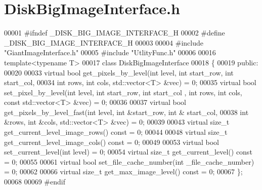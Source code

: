 \section{Disk\-Big\-Image\-Interface.\-h}
\label{_disk_big_image_interface_8h}

\begin{DoxyCode}
00001 \textcolor{preprocessor}{#ifndef \_DISK\_BIG\_IMAGE\_INTERFACE\_H}
00002 \textcolor{preprocessor}{}\textcolor{preprocessor}{#define \_DISK\_BIG\_IMAGE\_INTERFACE\_H}
00003 \textcolor{preprocessor}{}
00004 \textcolor{preprocessor}{#include "GiantImageInterface.h"}
00005 \textcolor{preprocessor}{#include "UtlityFunc.h"}
00006 
00016 \textcolor{keyword}{template}<\textcolor{keyword}{typename} T>
00017 \textcolor{keyword}{class }DiskBigImageInterface
00018 \{
00019 \textcolor{keyword}{public}:
00020 
00033         \textcolor{keyword}{virtual} \textcolor{keywordtype}{bool} get_pixels_by_level(\textcolor{keywordtype}{int} level, \textcolor{keywordtype}{int} start\_row, \textcolor{keywordtype}{int} 
      start\_col,
00034                 \textcolor{keywordtype}{int} rows, \textcolor{keywordtype}{int} cols, std::vector<T> &vec) = 0;
00035         \textcolor{keyword}{virtual} \textcolor{keywordtype}{bool} set\_pixel\_by\_level(\textcolor{keywordtype}{int} level, \textcolor{keywordtype}{int} start\_row, \textcolor{keywordtype}{int} start\_col
      , \textcolor{keywordtype}{int} rows, \textcolor{keywordtype}{int} cols, \textcolor{keyword}{const} std::vector<T> &vec) = 0;
00036 
00037         \textcolor{keyword}{virtual} \textcolor{keywordtype}{bool} get\_pixels\_by\_level\_fast(\textcolor{keywordtype}{int} level, \textcolor{keywordtype}{int} &start\_row, \textcolor{keywordtype}{int} &
      start\_col,
00038                 \textcolor{keywordtype}{int} &rows, \textcolor{keywordtype}{int} &cols, std::vector<T> &vec) = 0;
00039 
00043         \textcolor{keyword}{virtual} \textcolor{keywordtype}{size\_t} get_current_level_image_rows() \textcolor{keyword}{const} = 0;
00044 
00048         \textcolor{keyword}{virtual} \textcolor{keywordtype}{size\_t} get_current_level_image_cols() \textcolor{keyword}{const} = 0;
00049 
00053         \textcolor{keyword}{virtual} \textcolor{keywordtype}{bool} set_current_level(\textcolor{keywordtype}{int} level) = 0;
00054         \textcolor{keyword}{virtual} \textcolor{keywordtype}{size\_t} get\_current\_level() \textcolor{keyword}{const} = 0;
00055 
00061         \textcolor{keyword}{virtual} \textcolor{keywordtype}{bool} set_file_cache_number(\textcolor{keywordtype}{int} \_file\_cache\_number) = 0;
00062 
00066         \textcolor{keyword}{virtual} \textcolor{keywordtype}{size\_t} get_max_image_level() \textcolor{keyword}{const} = 0;
00067 \};
00068 
00069 \textcolor{preprocessor}{#endif}
\end{DoxyCode}
